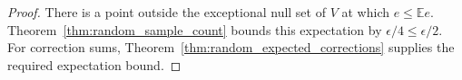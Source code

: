 \begin{proof}\leanok
    There is a point outside the exceptional null set of $V$ at which
    $e\leq\mathbb E e$. Theorem~\ref{thm:random_sample_count} bounds this
    expectation by $\epsilon/4\leq\epsilon/2$.
    For correction sums, Theorem~\ref{thm:random_expected_corrections}
    supplies the required expectation bound.
\end{proof}
